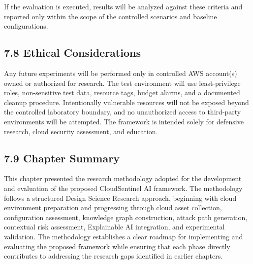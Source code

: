 If the evaluation is executed, results will be analyzed against these criteria and reported only within the scope of the controlled scenarios and baseline configurations.

\subsection{7.8 Ethical Considerations}

Any future experiments will be performed only in controlled AWS account(s) owned or authorized for research. The test environment will use least-privilege roles, non-sensitive test data, resource tags, budget alarms, and a documented cleanup procedure. Intentionally vulnerable resources will not be exposed beyond the controlled laboratory boundary, and no unauthorized access to third-party environments will be attempted. The framework is intended solely for defensive research, cloud security assessment, and education.

\subsection{7.9 Chapter Summary}

This chapter presented the research methodology adopted for the development and evaluation of the proposed CloudSentinel AI framework. The methodology follows a structured Design Science Research approach, beginning with cloud environment preparation and progressing through cloud asset collection, configuration assessment, knowledge graph construction, attack path generation, contextual risk assessment, Explainable AI integration, and experimental validation. The methodology establishes a clear roadmap for implementing and evaluating the proposed framework while ensuring that each phase directly contributes to addressing the research gaps identified in earlier chapters.
